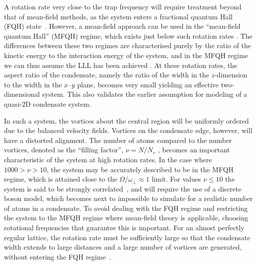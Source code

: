 A rotation rate very close to the trap frequency will require treatment beyond that of mean-field methods, as the system enters a fractional quantum Hall (FQH) state~\cite{Vtx:Regnault_prl_2003}. However, a mean-field approach can be used in the ``mean-field quantum Hall'' (MFQH) regime, which exists just below such rotation rates \cite{BEC:Fetter_revmodphys_2009}. The differences between these two regimes are characterised purely by the ratio of the kinetic energy to the interaction energy of the system, and in the MFQH regime we can thus assume the LLL has been achieved \cite{Vtx:Zhai_pra_2004,BEC:Stock_laserphyslett_2005}. At these rotation rates, the aspect ratio of the condensate, namely the ratio of the width in the $z$-dimension to the width in the $x$--$y$ plane, becomes very small yielding an effective two-dimensional system. This also validates the earlier assumption for modeling of a quasi-2D condensate system.

In such a system, the vortices about the central region will be uniformly ordered due to the balanced velocity fields. Vortices on the condensate edge, however, will have a distorted alignment. The number of atoms compared to the number vortices, denoted as the ``filling factor'', $\nu=N/N_v$ \cite{BK:Ueda_2010,Vtx:Ho_prl_2001}, becomes an important characteristic of the system at high rotation rates. In the case where $1000 > \nu > 10$, the system may be accurately described to be in the MFQH regime, which is attained close to the $\Omega / \omega_{\perp}\approx 1$ limit. For values $\nu \leq 10$ the system is said to be strongly correlated~\cite{BEC:Fetter_revmodphys_2009}, and will require the use of a discrete boson model, which becomes next to impossible to simulate for a realistic number of atoms in a condensate. To avoid dealing with the FQH regime and restricting the system to the MFQH regime where mean-field theory is applicable, choosing rotational frequencies that guarantee this is important. For an almost perfectly regular lattice, the rotation rate must be sufficiently large so that the condensate width extends to large distances and a large number of vortices are generated, without entering the FQH regime~\cite{Vtx:Aftalion_pra_2005}.

